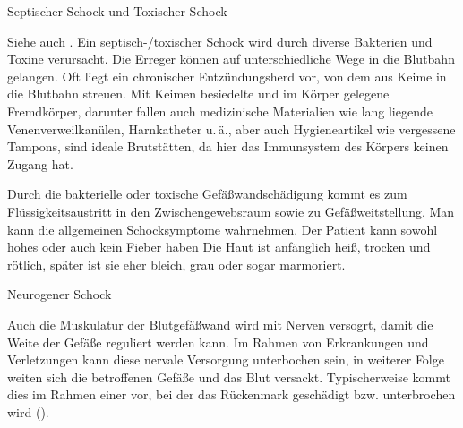 
{Septischer Schock und Toxischer Schock}
{%
\label{topic:schock-septischer}
\label{topic:schock-toxischer}
Siehe auch .
%
Ein septisch-/toxischer
Schock wird durch diverse Bakterien und Toxine verursacht.
Die Erreger können auf unterschiedliche Wege in die Blutbahn
gelangen. Oft liegt ein chronischer Entzündungsherd vor, von
dem aus Keime in die Blutbahn streuen.  Mit Keimen
besiedelte und im Körper gelegene Fremdkörper, darunter
fallen auch medizinische Materialien wie
lang liegende Venenverweilkanülen, Harnkatheter u.\,ä., aber
auch Hygieneartikel wie vergessene Tampons, sind ideale
Brutstätten, da hier das Immunsystem des Körpers keinen Zugang hat. 

Durch die bakterielle oder toxische Gefäßwandschädigung kommt es
zum Flüssigkeitsaustritt in den Zwischengewebsraum sowie zu Gefäßweitstellung.
Man kann die allgemeinen Schocksymptome wahrnehmen. Der
Patient kann sowohl hohes  oder auch kein Fieber haben
Die Haut ist anfänglich heiß, trocken und rötlich, später
ist sie eher bleich, grau oder sogar marmoriert.
}
{}
{}
{}
{}



{Neurogener Schock}
{%
Auch die Muskulatur der Blutgefäßwand wird mit Nerven
versogrt, damit die Weite der Gefäße reguliert werden kann.
Im Rahmen von Erkrankungen und Verletzungen kann diese
nervale Versorgung unterbochen sein, in weiterer Folge
weiten sich die betroffenen Gefäße und das Blut versackt. 
Typischerweise kommt dies im Rahmen einer
 vor, bei der das Rückenmark
geschädigt bzw. unterbrochen wird ().

}
{}
{}
{}
{}


